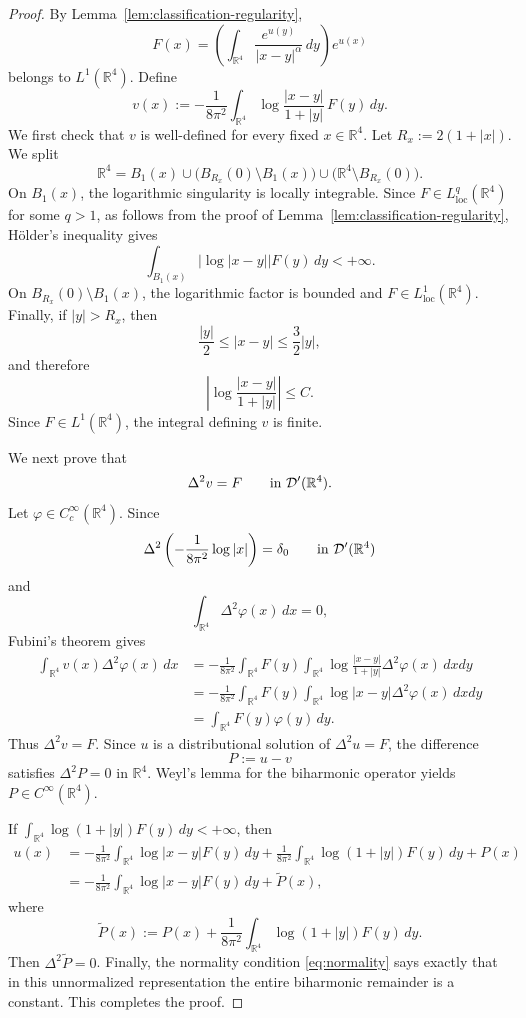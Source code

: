\documentclass[11pt]{article}
\numberwithin{equation}{section}
\begin{document}
\begin{proof}
By Lemma~\ref{lem:classification-regularity},
\[
F(x)=
\left(
\int_{\mathbb R^{4}}\frac{e^{u(y)}}{|x-y|^{\alpha}}\,dy
\right)e^{u(x)}
\]
belongs to \(L^{1}(\mathbb R^{4})\). Define
\[
v(x):=
-\frac{1}{8\pi^{2}}
\int_{\mathbb R^{4}}
\log\frac{|x-y|}{1+|y|}\,F(y)\,dy .
\]
We first check that \(v\) is well-defined for every fixed \(x\in\mathbb R^{4}\). Let \(R_{x}:=2(1+|x|)\). We split
\[
\mathbb R^{4}
=
B_{1}(x)
\cup
\bigl(B_{R_{x}}(0)\setminus B_{1}(x)\bigr)
\cup
\bigl(\mathbb R^{4}\setminus B_{R_{x}}(0)\bigr).
\]
On \(B_{1}(x)\), the logarithmic singularity is locally integrable. Since \(F\in L^{q}_{\operatorname{loc}}(\mathbb R^{4})\) for some \(q>1\), as follows from the proof of Lemma~\ref{lem:classification-regularity}, H\"older's inequality gives
\[
\int_{B_{1}(x)}|\log |x-y||F(y)\,dy<+\infty.
\]
On \(B_{R_{x}}(0)\setminus B_{1}(x)\), the logarithmic factor is bounded and \(F\in L^{1}_{\operatorname{loc}}(\mathbb R^{4})\). Finally, if \(|y|>R_x\), then
\[
\frac{|y|}{2}\leq |x-y|\leq \frac32 |y|,
\]
and therefore
\[
\left|\log\frac{|x-y|}{1+|y|}\right|\leq C.
\]
Since \(F\in L^{1}(\mathbb R^{4})\), the integral defining \(v\) is finite.

We next prove that
\[
\Delta^{2}v=F
\qquad \hbox{in }\mathcal D'(\mathbb R^{4}).
\]
Let \(\varphi\in C_{c}^{\infty}(\mathbb R^{4})\). Since
\[
\Delta^{2}\left(-\frac{1}{8\pi^{2}}\log|x|\right)=\delta_{0}
\qquad \hbox{in }\mathcal D'(\mathbb R^{4})
\]
and
\[
\int_{\mathbb R^{4}}\Delta^{2}\varphi(x)\,dx=0,
\]
Fubini's theorem gives
\[
\begin{aligned}
\int_{\mathbb R^{4}}v(x)\Delta^{2}\varphi(x)\,dx
&=
-\frac{1}{8\pi^{2}}
\int_{\mathbb R^{4}}F(y)
\int_{\mathbb R^{4}}
\log\frac{|x-y|}{1+|y|}
\Delta^{2}\varphi(x)\,dxdy  \\
&=
-\frac{1}{8\pi^{2}}
\int_{\mathbb R^{4}}F(y)
\int_{\mathbb R^{4}}\log|x-y|\Delta^{2}\varphi(x)\,dxdy  \\
&=
\int_{\mathbb R^{4}}F(y)\varphi(y)\,dy .
\end{aligned}
\]
Thus \(\Delta^{2}v=F\). Since \(u\) is a distributional solution of \(\Delta^{2}u=F\), the difference
\[
P:=u-v
\]
satisfies \(\Delta^{2}P=0\) in \(\mathbb R^{4}\). Weyl's lemma for the biharmonic operator yields \(P\in C^{\infty}(\mathbb R^{4})\).

If \(\int_{\mathbb R^{4}}\log(1+|y|)F(y)\,dy<+\infty\), then
\[
\begin{aligned}
u(x)
&=
-\frac{1}{8\pi^{2}}
\int_{\mathbb R^{4}}\log|x-y|F(y)\,dy
+
\frac{1}{8\pi^{2}}
\int_{\mathbb R^{4}}\log(1+|y|)F(y)\,dy
+P(x) \\
&=
-\frac{1}{8\pi^{2}}
\int_{\mathbb R^{4}}\log|x-y|F(y)\,dy
+\widetilde P(x),
\end{aligned}
\]
where
\[
\widetilde P(x):=
P(x)+
\frac{1}{8\pi^{2}}
\int_{\mathbb R^{4}}\log(1+|y|)F(y)\,dy.
\]
Then \(\Delta^{2}\widetilde P=0\). Finally, the normality condition \eqref{eq:normality} says exactly that in this unnormalized representation the entire biharmonic remainder is a constant. This completes the proof.
\end{proof}
\end{document}
